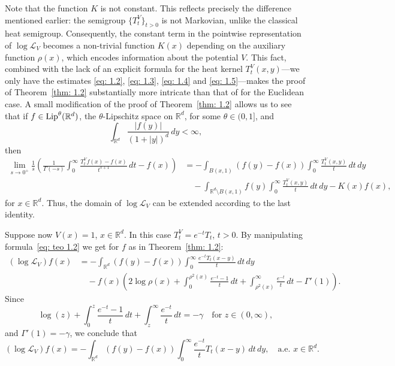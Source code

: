 \documentclass[10pt, a4paper, reqno]{amsart}
\theoremstyle{definition}
\theoremstyle{remark}
\newcommand{\Lip}{\textup{Lip}}
\numberwithin{equation}{section}
\begin{document}
Note that the function $K$ is not constant. This reflects precisely the difference mentioned earlier: the semigroup $\{T_t^V\}_{t>0}$ is not Markovian, unlike the classical heat semigroup. Consequently, the constant term in the pointwise representation of $\log \mathcal{L}_V$ becomes a non-trivial function $K(x)$ depending on the auxiliary function $\rho(x)$, which encodes information about the potential $V$. This fact, combined with the lack of an explicit formula for the heat kernel $T_t^V(x,y)$---we only have the estimates \eqref{eq: 1.2}, \eqref{eq: 1.3}, \eqref{eq: 1.4} and \eqref{eq: 1.5}---makes the proof of Theorem~\ref{thm: 1.2} substantially more intricate than that of \cite[Theorem~1.1]{ChW} for the Euclidean case.
A small modification of the proof of Theorem~\ref{thm: 1.2} allows us to see that if $f \in \Lip^\theta(\mathbb{R}^d)$, the $\theta$-Lipschitz space on $\mathbb{R}^d$, for some $\theta \in (0,1]$, and 
\begin{equation*}
    \int_{\mathbb{R}^d} \frac{|f(y)|}{(1+|y|)^{d}} \, dy < \infty,
\end{equation*}
then
\begin{equation*}
\begin{split}
    \lim_{s \rightarrow 0^+} \frac{1}{s} \left( \frac{1}{\Gamma(-s)} \int_0^\infty \frac{T_t^V f(x) - f(x)}{t^{s+1}} \, dt - f(x) \right) & = - \int_{B(x,1)} (f(y)-f(x)) \int_0^\infty \frac{T_t^V(x,y)}{t} \, dt \, dy \\
    & \quad -\int_{\mathbb{R}^d \setminus B(x,1)} f(y) \int_0^\infty \frac{T_t^V(x,y)}{t} \, dt \, dy - K(x)f(x),
\end{split}
\end{equation*}
for $x \in \mathbb{R}^d$. Thus, the domain of $\log \mathcal{L}_V$ can be extended according to the last identity.

Suppose now $V(x) = 1$, $x \in \mathbb{R}^d$. In this case $T_t^V = e^{-t} T_t$, $t > 0$. By manipulating formula~\eqref{eq: teo 1.2} we get for $f$ as in Theorem~\ref{thm: 1.2}:
\begin{equation*}
    \begin{split}
        (\log \mathcal{L}_V) f(x) & = -\int_{\mathbb{R}^d} (f(y)-f(x)) \int_0^\infty \frac{e^{-t}T_t(x-y)}{t} \, dt \, dy \\
        & \quad - f(x) \left( 2\log\rho(x) + \int_0^{\rho^2(x)} \frac{e^{-t} - 1}{t} \, dt + \int_{\rho^2(x)}^\infty \frac{e^{-t}}{t} \, dt - \Gamma'(1) \right).
    \end{split}
\end{equation*}
Since
\begin{equation*}
    \log(z) + \int_0^z \frac{e^{-t} - 1}{t} \, dt + \int_z^\infty \frac{e^{-t}}{t} \, dt = -\gamma \quad \text{for } z \in (0,\infty),
\end{equation*}
and $\Gamma'(1) = -\gamma$, we conclude that 
\begin{equation*}
    (\log \mathcal{L}_V) f(x) = -\int_{\mathbb{R}^d} (f(y)-f(x)) \int_0^\infty \frac{e^{-t}}{t} T_t(x-y) \, dt \, dy, \quad \text{a.e. } x \in \mathbb{R}^d.
\end{equation*}
\end{document}

